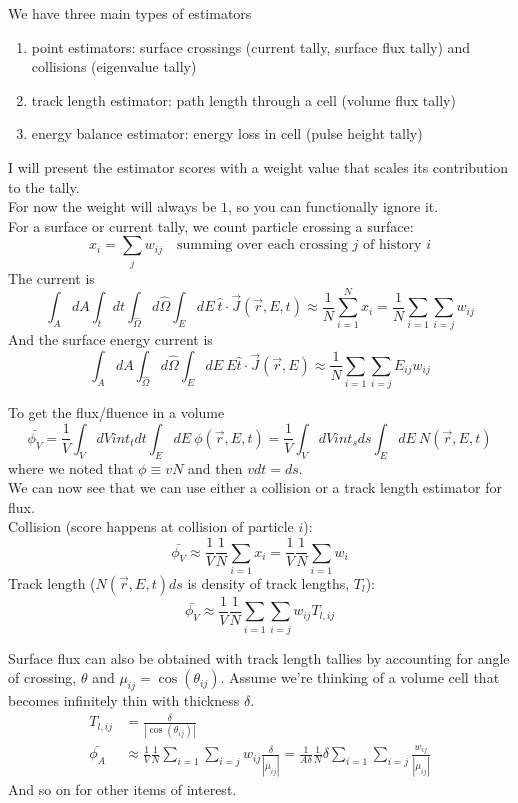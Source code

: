 \documentclass[12pt]{article}
\newcommand{\rvec}{\ensuremath{\vec{r}}}
\newcommand{\vOmega}{\ensuremath{\hat{\Omega}}}
\begin{document}

We have three main types of estimators
\begin{enumerate}
\item point estimators: surface crossings (current tally, surface flux tally) and collisions (eigenvalue tally)
\item track length estimator: path length through a cell (volume flux tally)
\item energy balance estimator: energy loss in cell (pulse height tally)
\end{enumerate}
%
I will present the estimator scores with a weight value that scales its contribution to the tally.\\
For now the weight will always be $1$, so you can functionally ignore it. \\

For a surface or current tally, we count particle crossing a surface:
\[
x_i = \sum_j w_{ij} \quad \text{summing over each crossing }j\text{ of history }i
\]
The current is
\[
\int_A dA \int_t dt \int_{\vOmega} d\vOmega \int_E dE\: \hat{t} \cdot \vec{J}(\rvec, E, t) \approx \frac{1}{N} \sum_{i=1}^N x_i = \frac{1}{N} \sum_{i=1}\sum_{i=j} w_{ij}
\]
And the surface energy current is
\[
\int_A dA \int_{\vOmega} d\vOmega \int_E dE\: E\hat{t} \cdot \vec{J}(\rvec, E) \approx \frac{1}{N} \sum_{i=1}\sum_{i=j} E_{ij}w_{ij}
\]

To get the flux/fluence in a volume
\[
\bar{\phi_V} = \frac{1}{V}\int_V dV int_t dt \int_E dE\: \phi(\rvec, E,t) =  \frac{1}{V}\int_V dV int_s ds \int_E dE\: N(\rvec, E,t)
\]
where we noted that $\phi \equiv vN$ and then $vdt = ds$.\\
We can now see that we can use either a collision or a track length estimator for flux.\\
Collision (score happens at collision of particle $i$):
\[
\bar{\phi_V} \approx \frac{1}{V}\frac{1}{N} \sum_{i=1} x_i = \frac{1}{V}\frac{1}{N} \sum_{i=1} w_i
\]
Track length ($N(\rvec, E,t)ds$ is density of track lengths, $T_l$):
\[
\bar{\phi_V} \approx \frac{1}{V}\frac{1}{N} \sum_{i=1}\sum_{i=j} w_{ij}T_{l,ij}
\]

Surface flux can also be obtained with track length tallies by accounting for angle of crossing, $\theta$ and $\mu_{ij} = \cos(\theta_{ij})$. Assume we're thinking of a volume cell that becomes infinitely thin with thickness $\delta$. 
\begin{align*}
T_{l,ij} &= \frac{\delta}{|\cos(\theta_{ij})|}\\
\bar{\phi_A} &\approx \frac{1}{V}\frac{1}{N} \sum_{i=1}\sum_{i=j} w_{ij}\frac{\delta}{|\mu_{ij}|} = \frac{1}{A \delta}\frac{1}{N} \delta \sum_{i=1}\sum_{i=j} \frac{w_{ij}}{|\mu_{ij}|}
\end{align*}
%
And so on for other items of interest.
\end{document}
